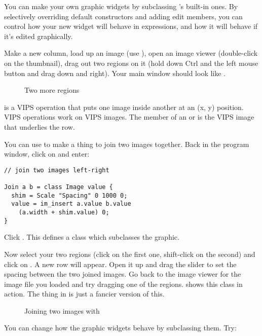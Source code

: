 You can make your own graphic widgets by subclassing \nip{}'s built-in
ones. By selectively overriding default constructors and adding edit members,
you can control how your new widget will behave in expressions, and how it
will behave if it's edited graphically.

Make a new column, load up an image (use ), open an
image viewer (double-click on the thumbnail), drag out two regions on it
(hold down Ctrl and the left mouse button and drag down and right). Your main 
window should look like .

\begin{figure}
\caption{Two more regions}
\end{figure}

 is a VIPS operation that puts one image inside another at an
(x, y) position. VIPS operations work on VIPS images. The  member of
an  or  is the VIPS image that underlies the \nip{} row.

You can use  to make a thing to join two images together. Back
in the program window, click on  and enter:

\begin{verbatim}
// join two images left-right

Join a b = class Image value {
  shim = Scale "Spacing" 0 1000 0;
  value = im_insert a.value b.value
    (a.width + shim.value) 0;
}
\end{verbatim}

\noindent
Click . This defines a class  which
subclasses the  graphic.  

Now select your two regions (click on the first one, shift-click on
the second) and click on . A
new  row will appear. Open it up and drag the slider to
set the spacing between the two joined images. Go back to the image
viewer for the image file you loaded and try dragging one of the
regions.  shows this class in action. The thing in
 is just a fancier
version of this.

\begin{figure}
\caption{Joining two images with }
\end{figure}

You can change how the graphic widgets behave by subclassing them. Try:

